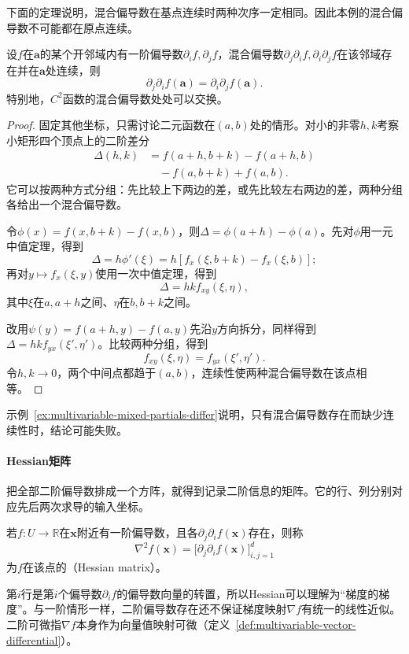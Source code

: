 下面的定理说明，混合偏导数在基点连续时两种次序一定相同。因此本例的混合偏导数不可能都在原点连续。
\begin{theorem}[混合偏导数的交换]
\label{thm:multivariable-mixed-partials}
设$f$在$\bm a$的某个开邻域内有一阶偏导数$\partial_i f,\partial_j f$，混合偏导数$\partial_j\partial_i f,\partial_i\partial_j f$在该邻域存在并在$\bm a$处连续，则
\begin{equation}
 \partial_j\partial_i f(\bm a)=\partial_i\partial_j f(\bm a).
\label{eq:multivariable-mixed-partials-symmetry}
\end{equation}
特别地，$C^2$函数的混合偏导数处处可以交换。
\end{theorem}
\begin{proof}
固定其他坐标，只需讨论二元函数在$(a,b)$处的情形。对小的非零$h,k$考察小矩形四个顶点上的二阶差分
\[
 \begin{aligned}
 \Delta(h,k)&=f(a+h,b+k)-f(a+h,b)\\
 &\quad-f(a,b+k)+f(a,b).
 \end{aligned}
\]
它可以按两种方式分组：先比较上下两边的差，或先比较左右两边的差，两种分组各给出一个混合偏导数。

令$\phi(x)=f(x,b+k)-f(x,b)$，则$\Delta=\phi(a+h)-\phi(a)$。先对$\phi$用一元中值定理，得到
\[
 \Delta=h\phi'(\xi)=h[f_x(\xi,b+k)-f_x(\xi,b)];
\]
再对$y\mapsto f_x(\xi,y)$使用一次中值定理，得到
\[
 \Delta=hk f_{xy}(\xi,\eta),
\]
其中$\xi$在$a,a+h$之间、$\eta$在$b,b+k$之间。

改用$\psi(y)=f(a+h,y)-f(a,y)$先沿$y$方向拆分，同样得到$\Delta=hk f_{yx}(\xi',\eta')$。比较两种分组，得到
\[
 f_{xy}(\xi,\eta)=f_{yx}(\xi',\eta').
\]
令$h,k\to0$，两个中间点都趋于$(a,b)$，连续性使两种混合偏导数在该点相等。
\end{proof}
示例~\ref{ex:multivariable-mixed-partials-differ}说明，只有混合偏导数存在而缺少连续性时，结论可能失败。

\paragraph{Hessian矩阵}
把全部二阶偏导数排成一个方阵，就得到记录二阶信息的矩阵。它的行、列分别对应先后两次求导的输入坐标。
\begin{definition}[Hessian矩阵]
\label{def:multivariable-hessian}
若$f:U\to\mathbb R$在$\bm x$附近有一阶偏导数，且各$\partial_j\partial_i f(\bm x)$存在，则称
\begin{equation}
 \nabla^2f(\bm x)=\bigl[\partial_j\partial_i f(\bm x)\bigr]_{i,j=1}^d
\label{eq:multivariable-hessian-definition}
\end{equation}
为$f$在该点的（Hessian matrix）。
\end{definition}
第$i$行是第$i$个偏导数$\partial_if$的偏导数向量的转置，所以Hessian可以理解为“梯度的梯度”。与一阶情形一样，二阶偏导数存在还不保证梯度映射$\nabla f$有统一的线性近似。二阶可微指$\nabla f$本身作为向量值映射可微（定义~\ref{def:multivariable-vector-differential}）。

